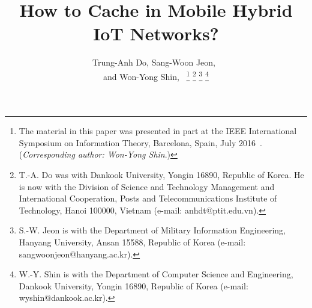 \documentclass[10pt,journal,compsoc,onecolumn]{IEEEtran}
\begin{document}
\sloppy
\title{How to Cache in Mobile Hybrid IoT Networks?}
\author{Trung-Anh Do, Sang-Woon Jeon,~ \\ and
        Won-Yong Shin,~%
\thanks{The
material in this paper was presented in part at the IEEE
International Symposium on Information Theory, Barcelona, Spain,
July 2016~\cite{c7}. (\textit{Corresponding author: Won-Yong
Shin}.)}
\thanks{T.-A. Do was with
Dankook University, Yongin 16890, Republic of Korea. He is now
with the Division of Science and Technology Management and
International Cooperation, Posts and Telecommunications Institute
of Technology, Hanoi 100000, Vietnam (e-mail: anhdt@ptit.edu.vn).}
\thanks{S.-W. Jeon is with the Department of
Military Information Engineering, Hanyang University, Ansan 15588,
Republic of Korea (e-mail: sangwoonjeon@hanyang.ac.kr).}
\thanks{W.-Y. Shin is with the Department of
Computer Science and Engineering, Dankook University,
Yongin 16890, Republic of Korea (e-mail: wyshin@dankook.ac.kr).}}



\newtheorem{definition}{Definition}%
\newtheorem{thm}{Theorem}%
\newtheorem{lemma}{Lemma}%
\newtheorem{example}{Example}
\newtheorem{corollary}{Corollary}%
\newtheorem{proposition}{Proposition}%
\newtheorem{conjecture}{Conjecture}%
\newtheorem{remark}{Remark}%

\newcommand{\red}[1]{{\textcolor[rgb]{1,0,0}{#1}}}

\def \diag{\operatornamewithlimits{diag}}
\def \min{\operatornamewithlimits{min}}
\def \max{\operatornamewithlimits{max}}
\def \log{\operatorname{log}}
\def \max{\operatorname{max}}
\def \rank{\operatorname{rank}}
\def \out{\operatorname{out}}
\def \exp{\operatorname{exp}}
\def \arg{\operatorname{arg}}
\def \E{\operatorname{E}}
\def \tr{\operatorname{tr}}
\def \SNR{\operatorname{SNR}}
\def \dB{\operatorname{dB}}
\def \ln{\operatorname{ln}}
\def \bmat{ \begin{bmatrix} }
\def \emat{ \end{bmatrix} }
\def \be {\begin{eqnarray}}
\def \ee {\end{eqnarray}}
\def \ben {\begin{eqnarray*}}
\def \een {\end{eqnarray*}}
\end{document}
